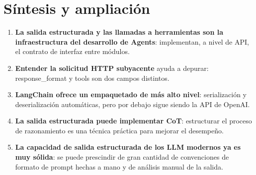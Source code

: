 \documentclass[a4paper]{article}
\begin{document}
\section{Síntesis y ampliación}

\begin{enumerate}
    \item \textbf{La salida estructurada y las llamadas a herramientas son la infraestructura del desarrollo de Agents}: implementan, a nivel de API, el contrato de interfaz entre módulos.
    \item \textbf{Entender la solicitud HTTP subyacente} ayuda a depurar: response\_format y tools son dos campos distintos.
    \item \textbf{LangChain ofrece un empaquetado de más alto nivel}: serialización y deserialización automáticas, pero por debajo sigue siendo la API de OpenAI.
    \item \textbf{La salida estructurada puede implementar CoT}: estructurar el proceso de razonamiento es una técnica práctica para mejorar el desempeño.
    \item \textbf{La capacidad de salida estructurada de los LLM modernos ya es muy sólida}: se puede prescindir de gran cantidad de convenciones de formato de prompt hechas a mano y de análisis manual de la salida.
\end{enumerate}
\end{document}
